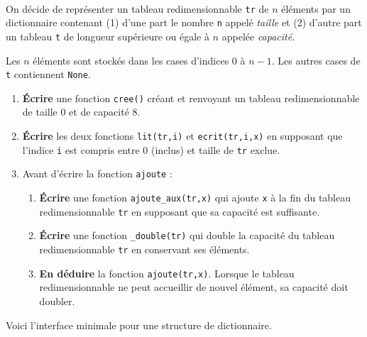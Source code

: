 \documentclass[a4paper,17pt]{extarticle}
\newenvironment{eleve}%
{\begin{activite}\color{noiramu}\\[-0.5cm]}
{\end{activite}}
\providecommand{\tightlist}{%
      \setlength{\itemsep}{0pt}\setlength{\parskip}{0pt}}
\begin{document}
\begin{eleve}
    On décide de représenter un tableau redimensionnable \texttt{tr} de
\(n\) éléments par un dictionnaire contenant (1) d'une part le nombre
\texttt{\textquotesingle{}n\textquotesingle{}} appelé \emph{taille} et
(2) d'autre part un tableau
\texttt{\textquotesingle{}t\textquotesingle{}} de longueur supérieure ou
égale à \(n\) appelée \emph{capacité}.

Les \(n\) éléments sont stockés dans les cases d'indices \(0\) à
\(n-1\). Les autres cases de \texttt{t} contiennent \texttt{None}.

\begin{enumerate}
\def\labelenumi{\arabic{enumi}.}
\tightlist
\item
  \textbf{Écrire} une fonction \texttt{cree()} créant et renvoyant un
  tableau redimensionnable de taille 0 et de capacité 8.
\item
  \textbf{Écrire} les deux fonctions \texttt{lit(tr,i)} et
  \texttt{ecrit(tr,i,x)} en supposant que l'indice \texttt{i} est
  compris entre 0 (inclus) et taille de \texttt{tr} exclue.
\item
  Avant d'écrire la fonction \texttt{ajoute} :

  \begin{enumerate}
  \def\labelenumii{\arabic{enumii}.}
  \tightlist
  \item
    \textbf{Écrire} une fonction \texttt{ajoute\_aux(tr,x)} qui ajoute
    \texttt{x} à la fin du tableau redimensionnable \texttt{tr} en
    supposant que sa capacité est suffisante.
  \item
    \textbf{Écrire} une fonction \texttt{\_double(tr)} qui double la
    capacité du tableau redimensionnable \texttt{tr} en conservant ses
    éléments.
  \item
    \textbf{En déduire} la fonction \texttt{ajoute(tr,x)}. Lorsque le
    tableau redimensionnable ne peut accueillir de nouvel élément, sa
    capacité doit doubler.
  \end{enumerate}
\end{enumerate}
        
        \end{eleve}
    Voici l'interface minimale pour une structure de dictionnaire.
\end{document}
